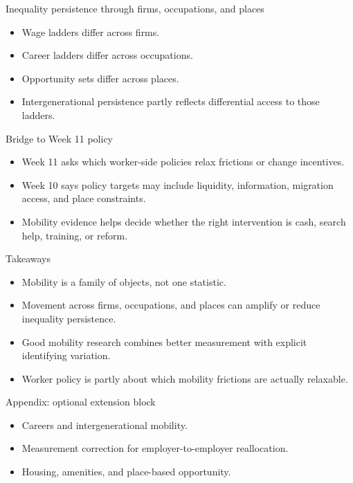\documentclass[aspectratio=169,11pt]{beamer}
\begin{document}
\begin{frame}{Inequality persistence through firms, occupations, and places}
\begin{itemize}
    \item Wage ladders differ across firms.
    \item Career ladders differ across occupations.
    \item Opportunity sets differ across places.
    \item Intergenerational persistence partly reflects differential access to those ladders.
\end{itemize}
\end{frame}

\begin{frame}{Bridge to Week 11 policy}
\begin{itemize}
    \item Week 11 asks which worker-side policies relax frictions or change incentives.
    \item Week 10 says policy targets may include liquidity, information, migration access, and place constraints.
    \item Mobility evidence helps decide whether the right intervention is cash, search help, training, or reform.
\end{itemize}
\end{frame}

\begin{frame}{Takeaways}
\begin{itemize}
    \item Mobility is a family of objects, not one statistic.
    \item Movement across firms, occupations, and places can amplify or reduce inequality persistence.
    \item Good mobility research combines better measurement with explicit identifying variation.
    \item Worker policy is partly about which mobility frictions are actually relaxable.
\end{itemize}
\end{frame}

\appendix

\begin{frame}{Appendix: optional extension block}
\begin{itemize}
    \item Careers and intergenerational mobility.
    \item Measurement correction for employer-to-employer reallocation.
    \item Housing, amenities, and place-based opportunity.
\end{itemize}
\end{frame}
\end{document}
